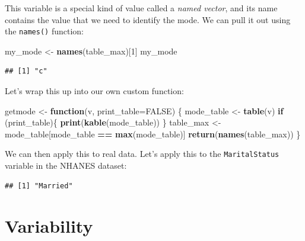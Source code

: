 \documentclass[
  12pt,
]{book}
\newenvironment{Shaded}{\begin{snugshade}}{\end{snugshade}}
\newcommand{\AttributeTok}[1]{\textcolor[rgb]{0.13,0.29,0.53}{#1}}
\newcommand{\ConstantTok}[1]{\textcolor[rgb]{0.56,0.35,0.01}{#1}}
\newcommand{\ControlFlowTok}[1]{\textcolor[rgb]{0.13,0.29,0.53}{\textbf{#1}}}
\newcommand{\DecValTok}[1]{\textcolor[rgb]{0.00,0.00,0.81}{#1}}
\newcommand{\FunctionTok}[1]{\textcolor[rgb]{0.13,0.29,0.53}{\textbf{#1}}}
\newcommand{\NormalTok}[1]{#1}
\newcommand{\OtherTok}[1]{\textcolor[rgb]{0.56,0.35,0.01}{#1}}
\newcommand{\SpecialCharTok}[1]{\textcolor[rgb]{0.81,0.36,0.00}{\textbf{#1}}}
\begin{document}
This variable is a special kind of value called a \emph{named vector}, and its name contains the value that we need to identify the mode. We can pull it out using the \texttt{names()} function:

\begin{Shaded}
\begin{Highlighting}[]
\NormalTok{my\_mode }\OtherTok{\textless{}{-}} \FunctionTok{names}\NormalTok{(table\_max)[}\DecValTok{1}\NormalTok{]}
\NormalTok{my\_mode}
\end{Highlighting}
\end{Shaded}

\begin{verbatim}
## [1] "c"
\end{verbatim}

Let's wrap this up into our own custom function:

\begin{Shaded}
\begin{Highlighting}[]
\NormalTok{getmode }\OtherTok{\textless{}{-}} \ControlFlowTok{function}\NormalTok{(v, }\AttributeTok{print\_table=}\ConstantTok{FALSE}\NormalTok{) \{}
\NormalTok{  mode\_table }\OtherTok{\textless{}{-}} \FunctionTok{table}\NormalTok{(v)}
  \ControlFlowTok{if}\NormalTok{ (print\_table)\{}
    \FunctionTok{print}\NormalTok{(}\FunctionTok{kable}\NormalTok{(mode\_table))}
\NormalTok{  \}}
\NormalTok{  table\_max }\OtherTok{\textless{}{-}}\NormalTok{ mode\_table[mode\_table }\SpecialCharTok{==} \FunctionTok{max}\NormalTok{(mode\_table)]}
  \FunctionTok{return}\NormalTok{(}\FunctionTok{names}\NormalTok{(table\_max))}
\NormalTok{\}}
\end{Highlighting}
\end{Shaded}

We can then apply this to real data. Let's apply this to the \texttt{MaritalStatus} variable in the NHANES dataset:

\begin{Shaded}
\end{Shaded}

\begin{verbatim}
## [1] "Married"
\end{verbatim}

\hypertarget{variability}{%
\section{Variability}\label{variability}}
\end{document}
